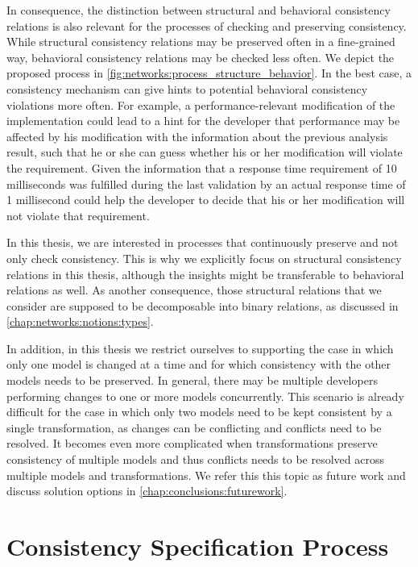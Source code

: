 In consequence, the distinction between structural and behavioral consistency relations is also relevant for the processes of checking and preserving consistency.
While structural consistency relations may be preserved often in a fine-grained way, behavioral consistency relations may be checked less often.
We depict the proposed process in \autoref{fig:networks:process_structure_behavior}.
In the best case, a consistency mechanism can give hints to potential behavioral consistency violations more often.
For example, a performance-relevant modification of the implementation could lead to a hint for the developer that performance may be affected by his modification with the information about the previous analysis result, such that he or she can guess whether his or her modification will violate the requirement.
Given the information that a response time requirement of 10 milliseconds was fulfilled during the last validation by an actual response time of 1 millisecond could help the developer to decide that his or her modification will not violate that requirement.

In this thesis, we are interested in processes that continuously preserve and not only check consistency.
This is why we explicitly focus on structural consistency relations in this thesis, although the insights might be transferable to behavioral relations as well.
As another consequence, those structural relations that we consider are supposed to be decomposable into binary relations, as discussed in \autoref{chap:networks:notions:types}.

In addition, in this thesis we restrict ourselves to supporting the case in which only one model is changed at a time and for which consistency with the other models needs to be preserved.
In general, there may be multiple developers performing changes to one or more models concurrently.
This scenario is already difficult for the case in which only two models need to be kept consistent by a single transformation, as changes can be conflicting and conflicts need to be resolved.
It becomes even more complicated when transformations preserve consistency of multiple models and thus conflicts needs to be resolved across multiple models and transformations.
We refer this this topic as future work and discuss solution options in \autoref{chap:conclusions:futurework}.


\section{Consistency Specification Process}
\label{chap:networks:specification_process}

